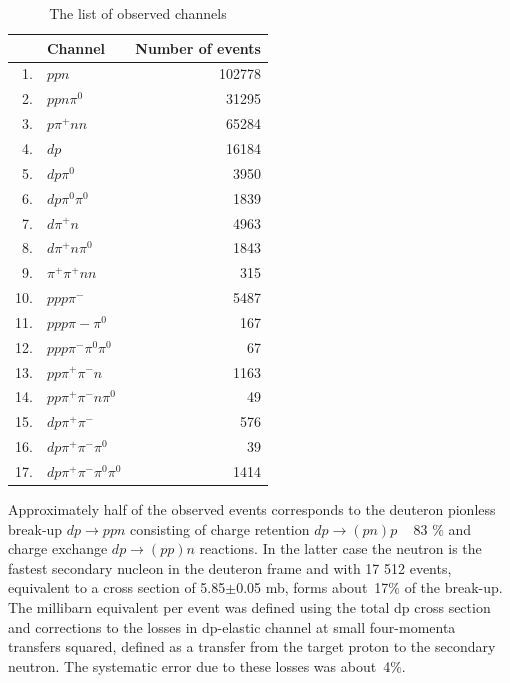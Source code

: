 \documentclass[a4paper,12pt]{article}
\begin{document}
\begin{table}[!hbp]
  \begin{center}
    \begin{tabular}{|r|l|r|} \hline &Channel&Number of events\\ \hline
      1.&$ppn$&102778\\ \hline 2.&$ppn\pi^{0}$&31295 \\ \hline
      3.&$p\pi^{+}nn$&65284 \\ \hline 4.&$dp$&16184\\ \hline
      5.&$dp\pi^{0}$&3950\\ \hline 6.&$dp\pi^{0}\pi^{0}$&1839\\ \hline
      7.&$d\pi^{+}n$&4963\\ \hline 8.&$d\pi^{+}n\pi^{0}$&1843\\ \hline
      9.&$\pi^{+}\pi^{+}nn$&315\\ \hline 10.&$ppp\pi^{-}$&5487\\
      \hline 11.&$ppp\pi{-}\pi^{0}$&167\\ \hline
      12.&$ppp\pi^{-}\pi^{0}\pi^{0}$&67\\ \hline
      13.&$pp\pi^{+}\pi^{-}n$&1163\\ \hline
      14.&$pp\pi^{+}\pi^{-}n\pi^{0}$&49\\ \hline
      15.&$dp\pi^{+}\pi^{-}$&576\\ \hline
      16.&$dp\pi^{+}\pi^{-}\pi^{0}$&39\\ \hline
      17.&$dp\pi^{+}\pi^{-}\pi^{0}\pi^{0}$&1414\\ \hline
    \end{tabular}
    \caption{The list of observed channels} \label{t_channels}
  \end{center}
\end{table}

Approximately half of the observed events corresponds to the deuteron pionless
break-up $dp \to ppn$ consisting of charge retention $dp \to (pn)p$  ~ 83 $\%$
and charge exchange $d p \to (pp)n$ reactions. In the latter case the neutron is
the fastest secondary nucleon in the deuteron frame and with 17 512 events,
equivalent to a cross section of 5.85$\pm$0.05 mb, forms about~17$\%$ of the
break-up. The millibarn equivalent per event was defined using the total dp
cross section \cite {a7} and corrections to the losses in dp-elastic channel at
small four-momenta transfers squared, defined as a transfer from the target
proton to the secondary neutron. The systematic error due to these losses was
about~4$\%$.
\end{document}
